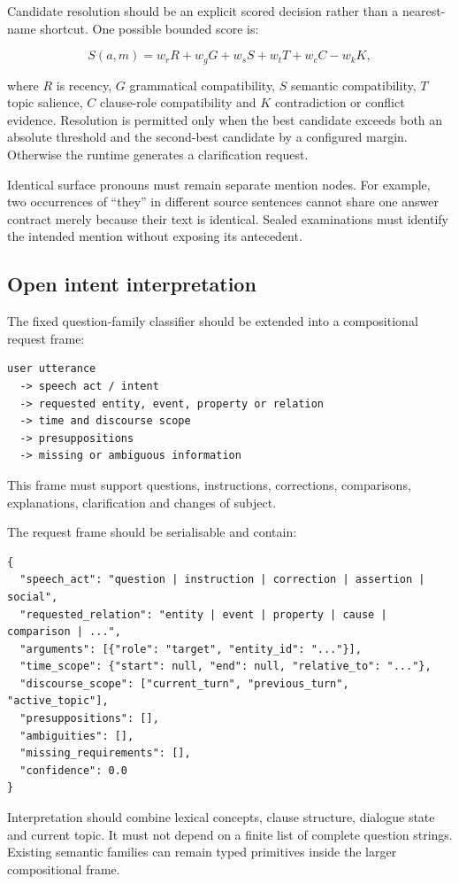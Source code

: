 \documentclass[11pt,a4paper]{article}
\begin{document}
Candidate resolution should be an explicit scored decision rather than a nearest-name shortcut.
One possible bounded score is:

\[
S(a,m)=w_rR+w_gG+w_sS+w_tT+w_cC-w_kK,
\]

where $R$ is recency, $G$ grammatical compatibility, $S$ semantic compatibility, $T$ topic
salience, $C$ clause-role compatibility and $K$ contradiction or conflict evidence.  Resolution
is permitted only when the best candidate exceeds both an absolute threshold and the second-best
candidate by a configured margin.  Otherwise the runtime generates a clarification request.

Identical surface pronouns must remain separate mention nodes.  For example, two occurrences of
``they'' in different source sentences cannot share one answer contract merely because their text
is identical.  Sealed examinations must identify the intended mention without exposing its
antecedent.

\subsection{Open intent interpretation}

The fixed question-family classifier should be extended into a compositional request frame:

\begin{lstlisting}
user utterance
  -> speech act / intent
  -> requested entity, event, property or relation
  -> time and discourse scope
  -> presuppositions
  -> missing or ambiguous information
\end{lstlisting}

This frame must support questions, instructions, corrections, comparisons, explanations,
clarification and changes of subject.

The request frame should be serialisable and contain:

\begin{lstlisting}
{
  "speech_act": "question | instruction | correction | assertion | social",
  "requested_relation": "entity | event | property | cause | comparison | ...",
  "arguments": [{"role": "target", "entity_id": "..."}],
  "time_scope": {"start": null, "end": null, "relative_to": "..."},
  "discourse_scope": ["current_turn", "previous_turn", "active_topic"],
  "presuppositions": [],
  "ambiguities": [],
  "missing_requirements": [],
  "confidence": 0.0
}
\end{lstlisting}

Interpretation should combine lexical concepts, clause structure, dialogue state and current
topic.  It must not depend on a finite list of complete question strings.  Existing semantic
families can remain typed primitives inside the larger compositional frame.
\end{document}
